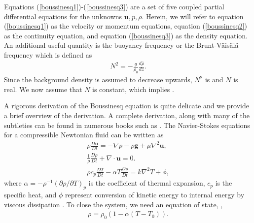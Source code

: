 Equations (\ref{boussinesq1})-(\ref{boussinesq3}) are a set of five coupled partial differential equations for the unknowns $\textbf{u},p,\rho$. Herein, we will refer to equation (\ref{boussinesq1}) as the velocity or momentum equations, equation (\ref{boussinesq2}) as the continuity equation, and equation (\ref{boussinesq3}) as the density equation. An additional useful quantity is the buoyancy frequency or the Brunt-V\"ais\"al\"a frequency which is defined as
\begin{align}
N^{2} = -\frac{g}{\rho_{0}}\frac{d\bar{\rho}}{dz}.
\end{align}
Since the background density is assumed to decrease upwards, $N^{2}$ is  and $N$ is real. We now assume that $N$ is constant, which implies .

A rigorous derivation of the Boussinesq equation is quite delicate and we provide a brief overview of the derivation. A complete derivation, along with many of the subtleties can be found in numerous books such as \cite{batchelor,kundu,tritton,vallis}. The Navier-Stokes equations for a compressible Newtonian fluid can be written as
\begin{align}
\rho \frac{D\bm{u}}{Dt} = -\nabla p - \rho \textbf{g} + \mu \nabla^{2}\bm{u},\\
\frac{1}{\rho}\frac{D\rho}{Dt} + \nabla \cdot \bm{u}=0.\\
\rho c_{p} \frac{DT}{Dt} -\alpha T \frac{D\rho}{Dt}=k\nabla^{2}T+\phi,\label{energy_equation}
\end{align}
where $\alpha=-\rho^{-1}(\partial \rho/\partial T)_{p}$ is the coefficient of thermal expansion, $c_{p}$ is the specific heat, and $\phi$ represent conversion of kinetic energy to internal energy by viscous dissipation \cite{waitecnotes}. To close the system, we need an equation of state, ,
\begin{align}
\rho = \rho_{0}(1-\alpha(T-T_{0})).\label{equation_of_state}
\end{align}

